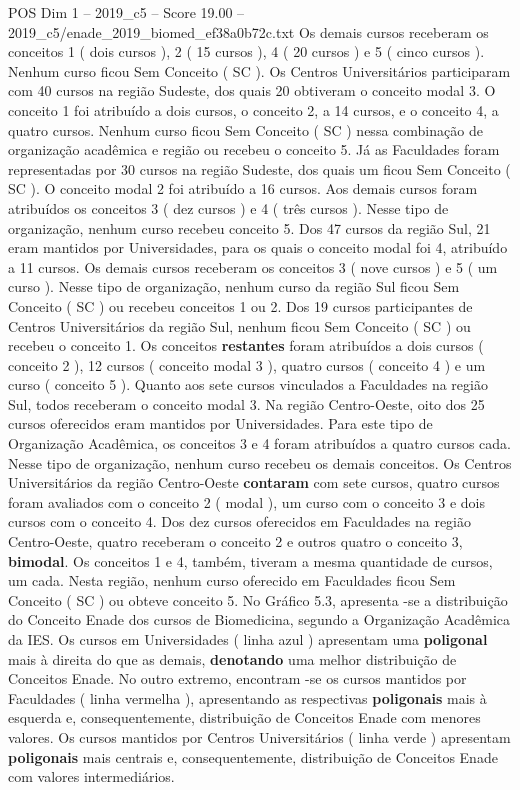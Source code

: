 \begin{textsample}{POS Dim 1 – 2019\_c5 – Score 19.00 – 2019\_c5/enade\_2019\_biomed\_ef38a0b72c.txt}
Os demais cursos receberam os conceitos 1 ( dois cursos ), 2 ( 15 cursos ), 4 ( 20 cursos ) e 5 ( cinco cursos ).
Nenhum curso ficou Sem Conceito ( SC ).
Os Centros Universitários participaram com 40 cursos na região Sudeste, dos quais 20 obtiveram o conceito modal 3.
O conceito 1 foi atribuído a dois cursos, o conceito 2, a 14 cursos, e o conceito 4, a quatro cursos.
Nenhum curso ficou Sem Conceito ( SC ) nessa combinação de organização acadêmica e região ou recebeu o conceito 5.
Já as Faculdades foram representadas por 30 cursos na região Sudeste, dos quais um ficou Sem Conceito ( SC ).
O conceito modal 2 foi atribuído a 16 cursos.
Aos demais cursos foram atribuídos os conceitos 3 ( dez cursos ) e 4 ( três cursos ).
Nesse tipo de organização, nenhum curso recebeu conceito 5.
Dos 47 cursos da região Sul, 21 eram mantidos por Universidades, para os quais o conceito modal foi 4, atribuído a 11 cursos.
Os demais cursos receberam os conceitos 3 ( nove cursos ) e 5 ( um curso ).
Nesse tipo de organização, nenhum curso da região Sul ficou Sem Conceito ( SC ) ou recebeu conceitos 1 ou 2.
Dos 19 cursos participantes de Centros Universitários da região Sul, nenhum ficou Sem Conceito ( SC ) ou recebeu o conceito 1.
Os conceitos \textbf{restantes} foram atribuídos a dois cursos ( conceito 2 ), 12 cursos ( conceito modal 3 ), quatro cursos ( conceito 4 ) e um curso ( conceito 5 ).
Quanto aos sete cursos vinculados a Faculdades na região Sul, todos receberam o conceito modal 3.
Na região Centro-Oeste, oito dos 25 cursos oferecidos eram mantidos por Universidades.
Para este tipo de Organização Acadêmica, os conceitos 3 e 4 foram atribuídos a quatro cursos cada.
Nesse tipo de organização, nenhum curso recebeu os demais conceitos.
Os Centros Universitários da região Centro-Oeste \textbf{contaram} com sete cursos, quatro cursos foram avaliados com o conceito 2 ( modal ), um curso com o conceito 3 e dois cursos com o conceito 4.
Dos dez cursos oferecidos em Faculdades na região Centro-Oeste, quatro receberam o conceito 2 e outros quatro o conceito 3, \textbf{bimodal}.
Os conceitos 1 e 4, também, tiveram a mesma quantidade de cursos, um cada.
Nesta região, nenhum curso oferecido em Faculdades ficou Sem Conceito ( SC ) ou obteve conceito 5.
No Gráfico 5.3, apresenta -se a distribuição do Conceito Enade dos cursos de Biomedicina, segundo a Organização Acadêmica da IES.
Os cursos em Universidades ( linha azul ) apresentam uma \textbf{poligonal} mais à direita do que as demais, \textbf{denotando} uma melhor distribuição de Conceitos Enade.
No outro extremo, encontram -se os cursos mantidos por Faculdades ( linha vermelha ), apresentando as respectivas \textbf{poligonais} mais à esquerda e, consequentemente, distribuição de Conceitos Enade com menores valores.
Os cursos mantidos por Centros Universitários ( linha verde ) apresentam \textbf{poligonais} mais centrais e, consequentemente, distribuição de Conceitos Enade com valores intermediários.

\end{textsample}
